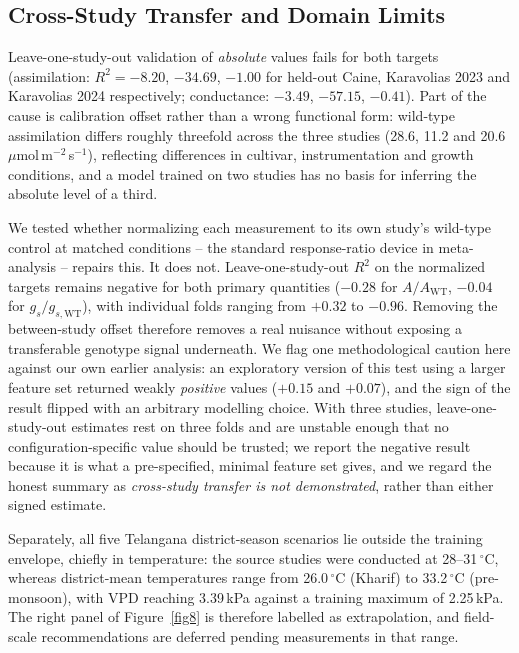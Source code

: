 \documentclass[runningheads]{llncs}
\begin{document}
\subsection{Cross-Study Transfer and Domain Limits}\label{sec:transfer}

Leave-one-study-out validation of \emph{absolute} values fails for both targets (assimilation: $R^{2}=-8.20$, $-34.69$, $-1.00$ for held-out Caine, Karavolias 2023 and Karavolias 2024 respectively; conductance: $-3.49$, $-57.15$, $-0.41$). Part of the cause is calibration offset rather than a wrong functional form: wild-type assimilation differs roughly threefold across the three studies (28.6, 11.2 and 20.6\,$\mu$mol\,m$^{-2}$\,s$^{-1}$), reflecting differences in cultivar, instrumentation and growth conditions, and a model trained on two studies has no basis for inferring the absolute level of a third.

We tested whether normalizing each measurement to its own study's wild-type control at matched conditions -- the standard response-ratio device in meta-analysis -- repairs this. It does not. Leave-one-study-out $R^{2}$ on the normalized targets remains negative for both primary quantities ($-0.28$ for $A/A_{\mathrm{WT}}$, $-0.04$ for $g_s/g_{s,\mathrm{WT}}$), with individual folds ranging from $+0.32$ to $-0.96$. Removing the between-study offset therefore removes a real nuisance without exposing a transferable genotype signal underneath. We flag one methodological caution here against our own earlier analysis: an exploratory version of this test using a larger feature set returned weakly \emph{positive} values ($+0.15$ and $+0.07$), and the sign of the result flipped with an arbitrary modelling choice. With three studies, leave-one-study-out estimates rest on three folds and are unstable enough that no configuration-specific value should be trusted; we report the negative result because it is what a pre-specified, minimal feature set gives, and we regard the honest summary as \emph{cross-study transfer is not demonstrated}, rather than either signed estimate.

Separately, all five Telangana district-season scenarios lie outside the training envelope, chiefly in temperature: the source studies were conducted at 28--31$\,^{\circ}$C, whereas district-mean temperatures range from 26.0$\,^{\circ}$C (Kharif) to 33.2$\,^{\circ}$C (pre-monsoon), with VPD reaching 3.39\,kPa against a training maximum of 2.25\,kPa. The right panel of Figure~\ref{fig8} is therefore labelled as extrapolation, and field-scale recommendations are deferred pending measurements in that range.
\end{document}

